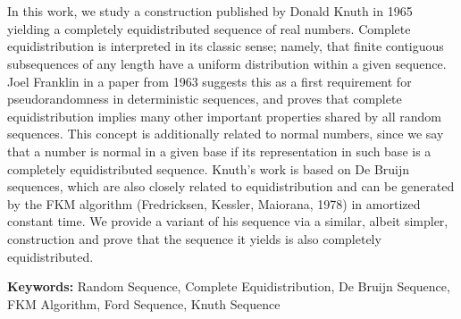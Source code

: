\chapter*{\runtitle}

\noindent In this work, we study a construction published by Donald Knuth in 1965 yielding a completely equidistributed sequence of real numbers. Complete equidistribution is interpreted in its classic sense; namely, that finite contiguous subsequences of any length have a uniform distribution within a given sequence. Joel Franklin in a paper from 1963 suggests this as a first requirement for pseudorandomness in deterministic sequences, and proves that complete equidistribution implies many other important properties shared by all random sequences. This concept is additionally related to normal numbers, since we say that a number is normal in a given base if its representation in such base is a completely equidistributed sequence. Knuth's work is based on De Bruijn sequences, which are also closely related to equidistribution and can be generated by the FKM algorithm (Fredricksen, Kessler, Maiorana, 1978) in amortized constant time. We provide a variant of his sequence via a similar, albeit simpler, construction and prove that the sequence it yields is also completely equidistributed.

\bigskip

\noindent\textbf{Keywords:} Random Sequence, Complete Equidistribution, De Bruijn Sequence, FKM Algorithm, Ford Sequence, Knuth Sequence